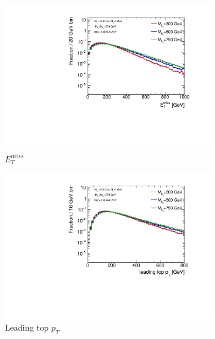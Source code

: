 \begin{figure}
  \centering
  \begin{subfigure}[b]{0.49\textwidth}
    \includegraphics[width=\textwidth]{texinputs/04_grid/figures/DMHF/benchmarking/MDM_1_Ma_700_sinp_0.7071_tanb_1.0_SCAN_MA/metlog.pdf}
    \caption{$E_{T}^{miss}$}
  \end{subfigure}
  \begin{subfigure}[b]{0.49\textwidth}
    \includegraphics[width=\textwidth]{texinputs/04_grid/figures/DMHF/benchmarking/MDM_1_Ma_700_sinp_0.7071_tanb_1.0_SCAN_MA/top1ptlog.pdf}
    \caption{Leading top $p_{T}$}
  \end{subfigure} \\
  \begin{subfigure}[b]{0.49\textwidth}

\end{subfigure}
\end{figure}
